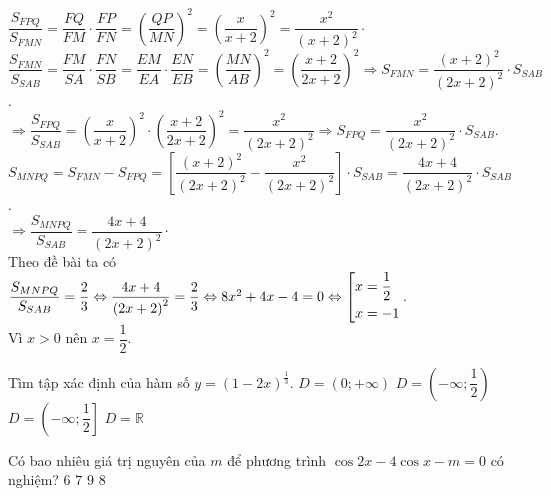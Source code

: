 \begin{ex}
{			$\dfrac{S_{FPQ}}{S_{FMN}}=\dfrac{FQ}{FM}\cdot \dfrac{FP}{FN}={\left(\dfrac{QP}{MN}\right)}^2={\left(\dfrac{x}{x+2}\right)}^2=\dfrac{x^2}{{\left(x+2\right)}^2}\cdot$\\
			$\dfrac{S_{FMN}}{S_{SAB}}=\dfrac{FM}{SA}\cdot\dfrac{FN}{SB}=\dfrac{EM}{EA}\cdot\dfrac{EN}{EB}={\left(\dfrac{MN}{AB}\right)}^2={\left(\dfrac{x+2}{2x+2}\right)}^2\Rightarrow S_{FMN}=\dfrac{{\left(x+2\right)}^2}{{\left(2x+2\right)}^2}\cdot S_{SAB}$. \\
			$\Rightarrow \dfrac{S_{FPQ}}{S_{SAB}}={\left(\dfrac{x}{x+2}\right)}^2\cdot{\left(\dfrac{x+2}{2x+2}\right)}^2=\dfrac{x^2}{{\left(2x+2\right)}^2}\Rightarrow S_{FPQ}=\dfrac{x^2}{{\left(2x+2\right)}^2}\cdot S_{SAB}$.\\
			$S_{MNPQ}=S_{FMN}-S_{FPQ}=\left[\dfrac{{\left(x+2\right)}^2}{{\left(2x+2\right)}^2}-\dfrac{x^2}{{\left(2x+2\right)}^2}\right]\cdot S_{SAB}=\dfrac{4x+4}{{\left(2x+2\right)}^2}\cdot S_{SAB}$.\\
			$\Rightarrow \dfrac{S_{MNPQ}}{S_{SAB}}=\dfrac{4x+4}{{\left(2x+2\right)}^2}\cdot$\\
			Theo đề bài ta có $\dfrac{S_{MNPQ}}{S_{SAB}}=\dfrac{2}{3}\Leftrightarrow \dfrac{4x+4}{{\left(2x+2\right)}^2}=\dfrac{2}{3}\Leftrightarrow 8x^2+4x-4=0\Leftrightarrow \left[\begin{aligned}
				& x=\dfrac{1}{2} \\ 
				& x=-1 \\\end{aligned}\right.$.\\
			Vì $x>0$ nên $x=\dfrac{1}{2}.$
	}
\end{ex}
\begin{ex}%
	Tìm tập xác định của hàm số $y={\left(1-2x\right)}^{\tfrac{1}{3}}$. 
	\choice
	{$D=\left(0;+\infty \right)$}
	{\True $D=\left(-\infty;\dfrac{1}{2}\right)$}
	{$D=\left(-\infty;\dfrac{1}{2}\right]$}
	{$D=\mathbb{R}$}
\end{ex}
\begin{ex}%
	Có bao nhiêu giá trị nguyên của $m$ để phương trình $\cos 2x-4\cos x-m=0$ có nghiệm?
	\choice
	{$6$}
	{$7$}
	{\True $9$}
	{$8$}
\end{ex}
